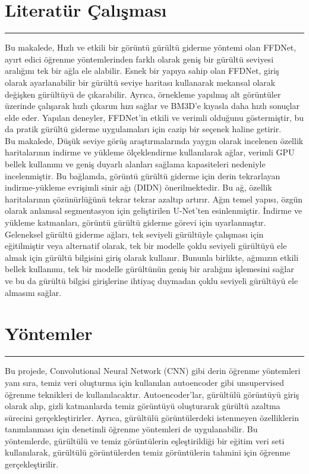 \documentclass{article}
\begin{document}
\section{Literatür Çalışması}
\rule{\textwidth}{0.5pt}

 \noindent Bu makalede\cite{zhang2018ffdnet}, Hızlı ve etkili bir görüntü gürültü giderme yöntemi olan FFDNet, ayırt edici öğrenme yöntemlerinden farklı olarak geniş bir gürültü seviyesi aralığını tek bir ağla ele alabilir. Esnek bir yapıya sahip olan FFDNet, giriş olarak ayarlanabilir bir gürültü seviye haritası kullanarak mekansal olarak değişken gürültüyü de çıkarabilir. Ayrıca, örnekleme yapılmış alt görüntüler üzerinde çalışarak hızlı çıkarım hızı sağlar ve BM3D'e kıyasla daha hızlı sonuçlar elde eder. Yapılan deneyler, FFDNet'in etkili ve verimli olduğunu göstermiştir, bu da pratik gürültü giderme uygulamaları için cazip bir seçenek haline getirir.\\[10pt]

 \noindent Bu makalede\cite{yu2019deep}, Düşük seviye görüş araştırmalarında yaygın olarak incelenen özellik haritalarının indirme ve yükleme ölçeklendirme kullanılarak ağlar, verimli GPU bellek kullanımı ve geniş duyarlı alanları sağlama kapasiteleri nedeniyle incelenmiştir. Bu bağlamda, görüntü gürültü giderme için derin tekrarlayan indirme-yükleme evrişimli sinir ağı (DIDN) önerilmektedir. Bu ağ, özellik haritalarının çözünürlüğünü tekrar tekrar azaltıp artırır. Ağın temel yapısı, özgün olarak anlamsal segmentasyon için geliştirilen U-Net'ten esinlenmiştir. İndirme ve yükleme katmanları, görüntü gürültü giderme görevi için uyarlanmıştır. Geleneksel gürültü giderme ağları, tek seviyeli gürültüyle çalışması için eğitilmiştir veya alternatif olarak, tek bir modelle çoklu seviyeli gürültüyü ele almak için gürültü bilgisini giriş olarak kullanır. Bununla birlikte, ağımızın etkili bellek kullanımı, tek bir modelle gürültünün geniş bir aralığını işlemesini sağlar ve bu da gürültü bilgisi girişlerine ihtiyaç duymadan çoklu seviyeli gürültüyü ele almasını sağlar.\\[10pt]


\noindent
\section{Yöntemler}
\rule{\textwidth}{0.5pt}
Bu projede, Convolutional Neural Network (CNN) gibi derin öğrenme yöntemleri yanı sıra, temiz veri oluşturma için kullanılan autoencoder gibi unsupervised öğrenme teknikleri de kullanılacaktır. Autoencoder'lar, gürültülü görüntüyü giriş olarak alıp, gizli katmanlarda temiz görüntüyü oluşturarak gürültü azaltma sürecini gerçekleştirirler. Ayrıca, gürültülü görüntülerdeki istenmeyen özelliklerin tanımlanması için denetimli öğrenme yöntemleri de uygulanabilir. Bu yöntemlerde, gürültülü ve temiz görüntülerin eşleştirildiği bir eğitim veri seti kullanılarak, gürültülü görüntülerden temiz görüntülerin tahmini için öğrenme gerçekleştirilir.\\[10pt]
\end{document}
